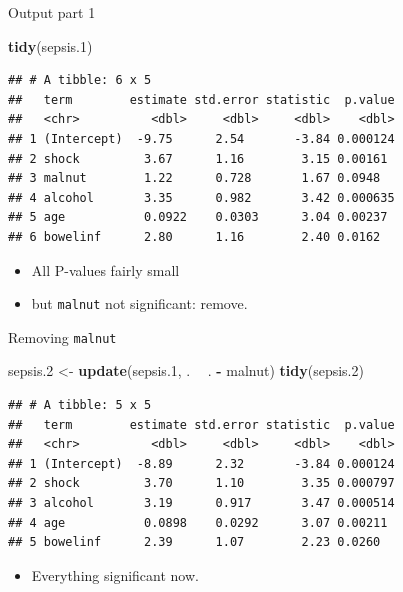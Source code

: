 \documentclass[
  ignorenonframetext,
]{beamer}
\newenvironment{Shaded}{\begin{snugshade}}{\end{snugshade}}
\newcommand{\FloatTok}[1]{\textcolor[rgb]{0.00,0.00,0.81}{#1}}
\newcommand{\KeywordTok}[1]{\textcolor[rgb]{0.13,0.29,0.53}{\textbf{#1}}}
\newcommand{\NormalTok}[1]{#1}
\newcommand{\OperatorTok}[1]{\textcolor[rgb]{0.81,0.36,0.00}{\textbf{#1}}}
\newcommand{\StringTok}[1]{\textcolor[rgb]{0.31,0.60,0.02}{#1}}
\providecommand{\tightlist}{%
  \setlength{\itemsep}{0pt}\setlength{\parskip}{0pt}}
\begin{document}
\begin{frame}[fragile]{Output part 1}
\protect\hypertarget{output-part-1}{}

\begin{Shaded}
\begin{Highlighting}[]
\KeywordTok{tidy}\NormalTok{(sepsis}\FloatTok{.1}\NormalTok{)}
\end{Highlighting}
\end{Shaded}

\begin{verbatim}
## # A tibble: 6 x 5
##   term        estimate std.error statistic  p.value
##   <chr>          <dbl>     <dbl>     <dbl>    <dbl>
## 1 (Intercept)  -9.75      2.54       -3.84 0.000124
## 2 shock         3.67      1.16        3.15 0.00161 
## 3 malnut        1.22      0.728       1.67 0.0948  
## 4 alcohol       3.35      0.982       3.42 0.000635
## 5 age           0.0922    0.0303      3.04 0.00237 
## 6 bowelinf      2.80      1.16        2.40 0.0162
\end{verbatim}

\begin{itemize}
\item
  All P-values fairly small
\item
  but \texttt{malnut} not significant: remove.
\end{itemize}

\end{frame}

\begin{frame}[fragile]{Removing \texttt{malnut}}
\protect\hypertarget{removing-malnut}{}

\begin{Shaded}
\begin{Highlighting}[]
\NormalTok{sepsis}\FloatTok{.2}\NormalTok{ <-}\StringTok{ }\KeywordTok{update}\NormalTok{(sepsis}\FloatTok{.1}\NormalTok{, . }\OperatorTok{~}\StringTok{ }\NormalTok{. }\OperatorTok{-}\StringTok{ }\NormalTok{malnut)}
\KeywordTok{tidy}\NormalTok{(sepsis}\FloatTok{.2}\NormalTok{)}
\end{Highlighting}
\end{Shaded}

\begin{verbatim}
## # A tibble: 5 x 5
##   term        estimate std.error statistic  p.value
##   <chr>          <dbl>     <dbl>     <dbl>    <dbl>
## 1 (Intercept)  -8.89      2.32       -3.84 0.000124
## 2 shock         3.70      1.10        3.35 0.000797
## 3 alcohol       3.19      0.917       3.47 0.000514
## 4 age           0.0898    0.0292      3.07 0.00211 
## 5 bowelinf      2.39      1.07        2.23 0.0260
\end{verbatim}

\begin{itemize}
\tightlist
\item
  Everything significant now.
\end{itemize}

\end{frame}
\end{document}
